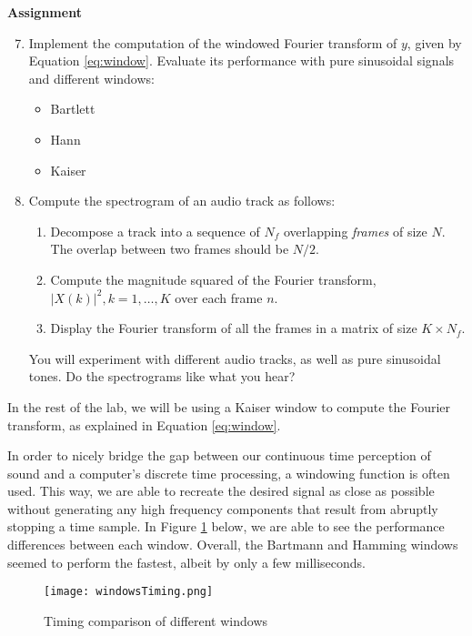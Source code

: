 \documentclass{article} %
\begin{document}
\begin{framed}
\textbf{Assignment}
\begin{enumerate}
\setcounter{enumi}{6}
\item Implement the computation of the windowed Fourier transform of $y$, given by Equation \ref{eq:window}.
Evaluate its performance with pure sinusoidal signals and different windows:
\begin{itemize}
\item Bartlett
\item Hann
\item Kaiser
\end{itemize}
\item Compute the spectrogram of an audio track as follows:
\begin{enumerate}
\item Decompose a track into a sequence of $N_f$ overlapping \emph{frames} of size $N$. The overlap between two frames should be $N/2$. 
\item Compute the magnitude squared of the Fourier transform, $|X(k)|^2,k=1,\dots,K$ over each frame $n$. 
\item Display the Fourier transform of all the frames in a matrix of size $K \times N_f$.
\end{enumerate}
You will experiment with different audio tracks, as well as pure sinusoidal tones. Do the spectrograms like what you hear?
\end{enumerate}
In the rest of the lab, we will be using a Kaiser window to compute the Fourier transform, as explained in Equation \ref{eq:window}.
\end{framed}

In order to nicely bridge the gap between our continuous time perception of sound and a computer's discrete time processing, a windowing function is often used. 
This way, we are able to recreate the desired signal as close as possible without generating any high frequency components that result from abruptly stopping a time sample. 
In Figure \ref{fig:windowsTiming} below, we are able to see the performance differences between each window. Overall, the Bartmann and Hamming windows seemed to perform
the fastest, albeit by only a few milliseconds. 

\begin{figure}[H]
\centering
\texttt{[image: windowsTiming.png]}
\caption{Timing comparison of different windows}
\label{fig:windowsTiming}
\end{figure}
\end{document}
